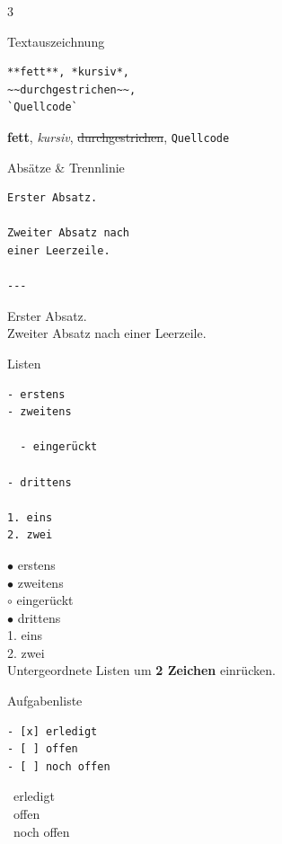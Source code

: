 \documentclass[a4paper,landscape,9pt]{extarticle}
\newcommand{\prevtxt}[1]{{\small #1}}
\begin{document}
\begin{multicols}{3}
\begin{mdcard}{Textauszeichnung}
\begin{lstlisting}[language=lia]
**fett**, *kursiv*,
~~durchgestrichen~~,
`Quellcode`
\end{lstlisting}
\tcblower
\prevtxt{\textbf{fett}, \textit{kursiv},
\sout{durchgestrichen}, \texttt{Quellcode}}
\end{mdcard}

\begin{mdcard}{Absätze \& Trennlinie}
\begin{lstlisting}[language=lia]
Erster Absatz.

Zweiter Absatz nach
einer Leerzeile.

---
\end{lstlisting}
\tcblower
\prevtxt{Erster Absatz.\\[3pt]
Zweiter Absatz nach einer Leerzeile.\\[2pt]
\textcolor{rulegray}{\hrulefill}}
\end{mdcard}

\begin{mdcard}{Listen}
\begin{lstlisting}[language=lia]
- erstens
- zweitens

  - eingerückt

- drittens

1. eins
2. zwei
\end{lstlisting}
\tcblower
\prevtxt{%
$\bullet$ erstens\\
$\bullet$ zweitens\\[2pt]
\hspace*{1em}$\circ$ eingerückt\\[2pt]
$\bullet$ drittens\\[3pt]
1. eins\\
2. zwei\\[2pt]
{\scriptsize\color{muted}Untergeordnete Listen um \textbf{2 Zeichen} einrücken.}}
\end{mdcard}

\begin{mdcard}{Aufgabenliste}
\begin{lstlisting}[language=lia]
- [x] erledigt
- [ ] offen
- [ ] noch offen
\end{lstlisting}
\tcblower
\prevtxt{%
\faCheckSquare~erledigt\\
\faSquare~offen\\
\faSquare~noch offen}
\end{mdcard}


\end{multicols}
\end{document}
